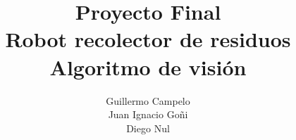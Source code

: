 \documentclass[a4paper,10pt]{article}
\title{Proyecto Final\\ Robot recolector de residuos \\ Algoritmo de visión}
\author{Guillermo Campelo\\Juan Ignacio Go\~ni\\Diego Nul}
\begin{document}
\maketitle




\newpage

\tableofcontents



\newpage

\appendix

%



\nocite{*}
\end{document}
